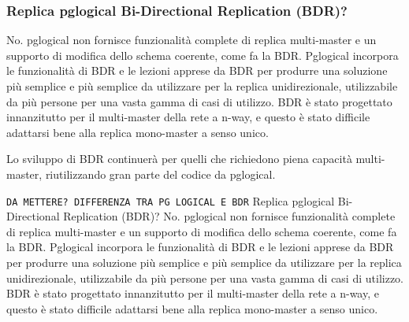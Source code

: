 \subsubsection{Replica pglogical Bi-Directional Replication (BDR)?}
No. pglogical non fornisce funzionalità complete di replica multi-master e un supporto di modifica dello schema coerente, come fa la BDR. Pglogical incorpora le funzionalità di BDR e le lezioni apprese da BDR per produrre una soluzione più semplice e più semplice da utilizzare per la replica unidirezionale, utilizzabile da più persone per una vasta gamma di casi di utilizzo. BDR è stato progettato innanzitutto per il multi-master della rete a n-way, e questo è stato difficile adattarsi bene alla replica mono-master a senso unico.

Lo sviluppo di BDR continuerà per quelli che richiedono piena capacità multi-master, riutilizzando gran parte del codice da pglogical.\cite{etichetta3}


\texttt{DA METTERE? DIFFERENZA TRA PG LOGICAL E BDR}
Replica pglogical Bi-Directional Replication (BDR)?
No. pglogical non fornisce funzionalità complete di replica multi-master e un supporto di modifica dello schema coerente, come fa la BDR. Pglogical incorpora le funzionalità di BDR e le lezioni apprese da BDR per produrre una soluzione più semplice e più semplice da utilizzare per la replica unidirezionale, utilizzabile da più persone per una vasta gamma di casi di utilizzo. BDR è stato progettato innanzitutto per il multi-master della rete a n-way, e questo è stato difficile adattarsi bene alla replica mono-master a senso unico.
%
